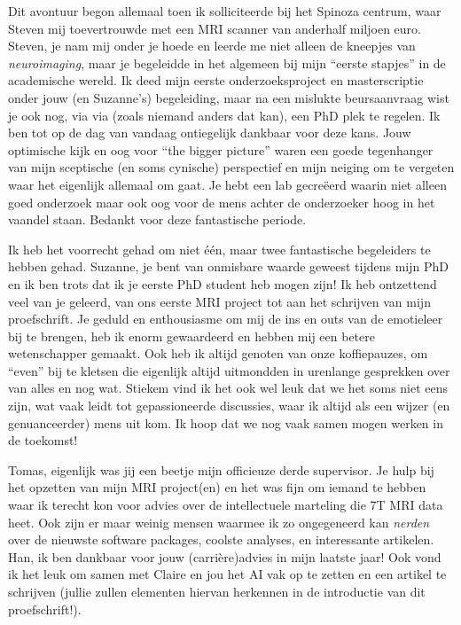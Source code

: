 \documentclass[11pt,american,a4paper,oneside,]{memoir} %
\begin{document}
Dit avontuur begon allemaal toen ik solliciteerde bij het Spinoza centrum, waar Steven mij toevertrouwde met een MRI scanner van anderhalf miljoen euro. Steven, je nam mij onder je hoede en leerde me niet alleen de kneepjes van \emph{neuroimaging}, maar je begeleidde in het algemeen bij mijn ``eerste stapjes'' in de academische wereld. Ik deed mijn eerste onderzoeksproject en masterscriptie onder jouw (en Suzanne's) begeleiding, maar na een mislukte beursaanvraag wist je ook nog, via via (zoals niemand anders dat kan), een PhD plek te regelen. Ik ben tot op de dag van vandaag ontiegelijk dankbaar voor deze kans. Jouw optimische kijk en oog voor ``the bigger picture'' waren een goede tegenhanger van mijn sceptische (en soms cynische) perspectief en mijn neiging om te vergeten waar het eigenlijk allemaal om gaat. Je hebt een lab gecreëerd waarin niet alleen goed onderzoek maar ook oog voor de mens achter de onderzoeker hoog in het vaandel staan. Bedankt voor deze fantastische periode.

Ik heb het voorrecht gehad om niet één, maar twee fantastische begeleiders te hebben gehad. Suzanne, je bent van onmisbare waarde geweest tijdens mijn PhD en ik ben trots dat ik je eerste PhD student heb mogen zijn! Ik heb ontzettend veel van je geleerd, van ons eerste MRI project tot aan het schrijven van mijn proefschrift. Je geduld en enthousiasme om mij de ins en outs van de emotieleer bij te brengen, heb ik enorm gewaardeerd en hebben mij een betere wetenschapper gemaakt. Ook heb ik altijd genoten van onze koffiepauzes, om ``even'' bij te kletsen die eigenlijk altijd uitmondden in urenlange gesprekken over van alles en nog wat. Stiekem vind ik het ook wel leuk dat we het soms niet eens zijn, wat vaak leidt tot gepassioneerde discussies, waar ik altijd als een wijzer (en genuanceerder) mens uit kom. Ik hoop dat we nog vaak samen mogen werken in de toekomst!

Tomas, eigenlijk was jij een beetje mijn officieuze derde supervisor. Je hulp bij het opzetten van mijn MRI project(en) en het was fijn om iemand te hebben waar ik terecht kon voor advies over de intellectuele marteling die 7T MRI data heet. Ook zijn er maar weinig mensen waarmee ik zo ongegeneerd kan \emph{nerden} over de nieuwste software packages, coolste analyses, en interessante artikelen. Han, ik ben dankbaar voor jouw (carrière)advies in mijn laatste jaar! Ook vond ik het leuk om samen met Claire en jou het AI vak op te zetten en een artikel te schrijven (jullie zullen elementen hiervan herkennen in de introductie van dit proefschrift!).
\end{document}
